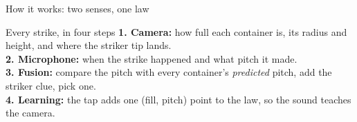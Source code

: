\begin{frame}{How it works: two senses, one law}
{}
    \vspace{1mm}
    \begin{block}{Every strike, in four steps}
        \scriptsize
        \textbf{1. Camera:} how full each container is, its radius and height, and where the striker tip lands.\\
        \textbf{2. Microphone:} when the strike happened and what pitch it made.\\
        \textbf{3. Fusion:} compare the pitch with every container's \emph{predicted} pitch, add the striker clue, pick one.\\
        \textbf{4. Learning:} the tap adds one (fill, pitch) point to the law, so the sound teaches the camera.
    \end{block}
\end{frame}

